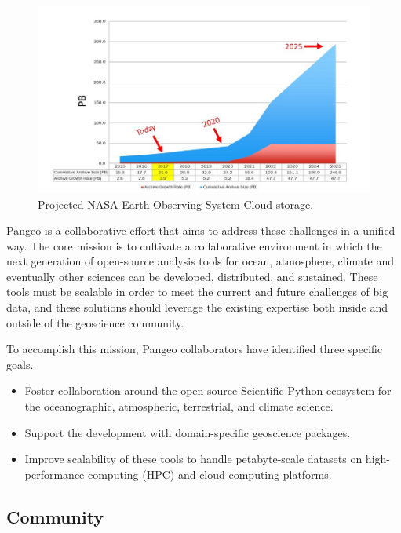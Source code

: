 \documentclass{article}
\begin{document}
\begin{figure}
  \centering
  \includegraphics[width=\columnwidth]{EOSDIS_archive_growth_updated_resize.jpg}
  \caption{\label{nasa_cloud_growth} Projected NASA Earth Observing System Cloud storage\cite{b2}.}
\end{figure}

Pangeo is a collaborative effort that aims to address these challenges in a unified way.
The core mission is to cultivate a collaborative environment in which the next generation of open-source analysis tools for ocean, atmosphere, climate and eventually other sciences can be developed, distributed, and sustained. These tools must be scalable in order to meet the current and future challenges of big data, and these solutions should leverage the existing expertise both inside and outside of the geoscience community.

To accomplish this mission, Pangeo collaborators have identified three specific goals.

\begin{itemize}
\item Foster collaboration around the open source Scientific Python ecosystem for the oceanographic, atmospheric, terrestrial, and climate science.
\item Support the development with domain-specific geoscience packages.
\item Improve scalability of these tools to handle petabyte-scale datasets on high-performance computing (HPC) and cloud computing platforms.
\end{itemize}

\subsection{Community}
\label{ssec:community}
\end{document}
